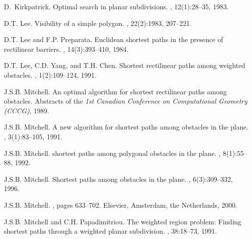 \documentclass[english,runningheads,11pt]{llncs}
\begin{document}
\begin{thebibliography}{10}
D.~Kirkpatrick.
\newblock Optimal search in planar subdivisions.
, 12(1):28--35, 1983.

D.T. Lee.
\newblock Visibility of a simple polygon.
, 22(2):1983,
  207--221.

D.T. Lee and F.P. Preparata.
\newblock Euclidean shortest paths in the presence of rectilinear barriers.
, 14(3):393--410, 1984.

D.T. Lee, C.D. Yang, and T.H. Chen.
\newblock Shortest rectilinear paths among weighted obstacles.
, 1(2):109--124, 1991.

J.S.B. Mitchell.
\newblock An optimal algorithm for shortest rectilinear paths among obstacles.
\newblock Abstracts of the {\em 1st Canadian Conference on Computational
  Geometry (CCCG)}, 1989.

J.S.B. Mitchell.
\newblock A new algorithm for shortest paths among obstacles in the plane.
,
  3(1):83--105, 1991.

J.S.B. Mitchell.
 shortest paths among polygonal obstacles in the plane.
, 8(1):55--88, 1992.

J.S.B. Mitchell.
\newblock Shortest paths among obstacles in the plane.
, 6(3):309--332, 1996.

J.S.B. Mitchell.
,
  pages 633--702.
\newblock Elsevier, Amsterdam, the Netherlands, 2000.

J.S.B. Mitchell and C.H. Papadimitriou.
\newblock The weighted region problem: Finding shortest paths through a
  weighted planar subdivision.
, 38:18--73, 1991.

\end{thebibliography}
\end{document}
